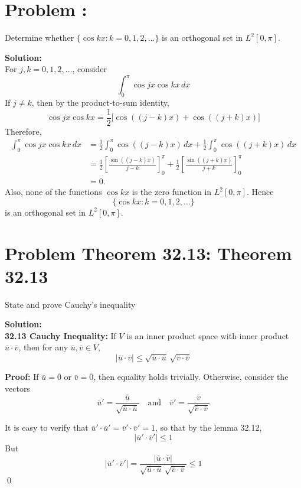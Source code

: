 \documentclass[a4paper]{article}
\theoremstyle{definition}
\newcounter{problem}
\newenvironment{problem}[1][]
{
    \stepcounter{problem}
    \section*{Problem \theproblem\ifx\relax#1\relax\else: #1\fi}
}
{}
\newenvironment{solution}
{
    \noindent\textbf{Solution:}\\
}
{
    
}
\begin{document}
\newpage
\begin{problem}
Determine whether $\{\cos kx:k=0,1,2,\ldots\}$ is an orthogonal set in
$L^2[0,\pi]$.
\end{problem}

\vspace{2em}
\begin{solution}
For $j,k=0,1,2,\ldots$, consider
\[
    \int_0^\pi \cos jx \cos kx\,dx
\]
If $j\neq k$, then by the product-to-sum identity,
\[
    \cos jx\cos kx
    =
    \frac{1}{2}\bigl[\cos((j-k)x)+\cos((j+k)x)\bigr]
\]
Therefore,
\[
\begin{aligned}
    \int_0^\pi \cos jx\cos kx\,dx
    &=
    \frac{1}{2}\int_0^\pi \cos((j-k)x)\,dx
    +
    \frac{1}{2}\int_0^\pi \cos((j+k)x)\,dx \\[4pt]
    &=
    \frac{1}{2}
    \left[\frac{\sin((j-k)x)}{j-k}\right]_0^\pi
    +
    \frac{1}{2}
    \left[\frac{\sin((j+k)x)}{j+k}\right]_0^\pi \\[4pt]
    &=0.
\end{aligned}
\]
Also, none of the functions $\cos kx$ is the zero function in $L^2[0,\pi]$.
Hence
\[
    \{\cos kx:k=0,1,2,\ldots\}
\]
is an orthogonal set in $L^2[0,\pi]$.
\end{solution}

\newpage
\begin{problem}[Theorem 32.13]
    State and prove Cauchy's inequality
\end{problem}

\vspace{2em}
\begin{solution}
\textbf{32.13 Cauchy Inequality:} If $V$ is an inner product space with inner product $\bar{u} \cdot \bar{v}$, then for any $\bar{u}, \bar{v} \in V$,
\[
|\bar{u} \cdot \bar{v}| \le \sqrt{\bar{u} \cdot \bar{u}} \, \sqrt{\bar{v} \cdot \bar{v}}
\]

\textbf{Proof:} If $\bar{u} = \bar{0}$ or $\bar{v} = \bar{0}$, then equality holds trivially. Otherwise, consider the vectors
\[
\bar{u}' = \frac{\bar{u}}{\sqrt{\bar{u} \cdot \bar{u}}}
\quad \text{and} \quad
\bar{v}' = \frac{\bar{v}}{\sqrt{\bar{v} \cdot \bar{v}}}
\]

It is easy to verify that $\bar{u}' \cdot \bar{u}' = \bar{v}' \cdot \bar{v}' = 1$, so that by the lemma 32.12,
\[
|\bar{u}' \cdot \bar{v}'| \le 1
\]
But
\[
|\bar{u}' \cdot \bar{v}'|
= \frac{|\bar{u} \cdot \bar{v}|}{\sqrt{\bar{u} \cdot \bar{u}} \, \sqrt{\bar{v} \cdot \bar{v}}}
\le 1
\]
\qed
\end{solution}
\end{document}
